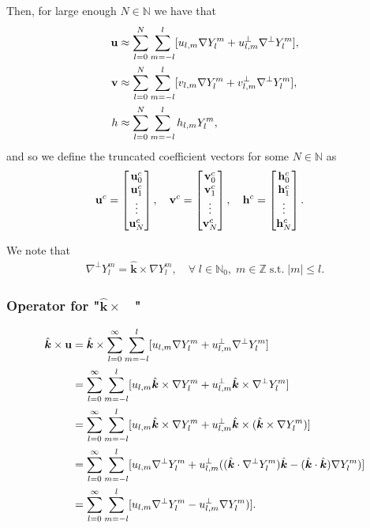 \documentclass[11pt, oneside]{article}   	%
\newcommand{\Z}{\mathbb{Z}}
\newcommand{\N}{\mathbb{N}}
\newcommand{\No}{\mathbb{N}_0}
\newcommand{\Ylm}{Y^m_l}
\newcommand{\gradYlm}{\nabla Y^m_l}
\newcommand{\gradpYlm}{\nabla^\perp Y^m_l}
\newcommand{\unitvec}{\hat{\bm{k}}}
\begin{document}
Then, for large enough \(N \in \N\) we have that
\begin{align}
\bold{u} &\approx \sum_{l=0}^{N} \sum_{m=-l}^{l} [ u_{l,m} \gradYlm + u^{\perp}_{l,m} \gradpYlm ], \\
\bold{v} &\approx \sum_{l=0}^{N} \sum_{m=-l}^{l} [ v_{l,m} \gradYlm + v^{\perp}_{l,m} \gradpYlm ], \\
h &\approx \sum_{l=0}^{N} \sum_{m=-l}^{l} h_{l,m} \Ylm,
\end{align}
and so we define the truncated coefficient vectors for some \(N \in \N\) as
\begin{align}
\bold{u}^c &= \begin{bmatrix}
			\bold{u}_0^c \\
			\bold{u}_1^c \\
			\vdots \\
			\bold{u}_N^c
		    \end{bmatrix},
\quad
\bold{v}^c = \begin{bmatrix}
			\bold{v}_0^c \\
			\bold{v}_1^c \\
			\vdots \\
			\bold{v}_N^c
		    \end{bmatrix},
\quad
\bold{h}^c = \begin{bmatrix}
			\bold{h}_0^c \\
			\bold{h}_1^c \\
			\vdots \\
			\bold{h}_N^c
		    \end{bmatrix}.		  
\end{align}

We note that
\begin{align}
\gradpYlm = \unitvec \times \gradYlm, \quad \forall \; l \in \No, \; m \in \Z \; \text{s.t.} \; |m| \le l.
\end{align}


\subsubsection{Operator for "\(\unitvec \times \quad\)"}
\begin{align}
\unitvec \times \bold{u} &= \unitvec \times \sum_{l=0}^{\infty} \sum_{m=-l}^{l} [ u_{l,m} \gradYlm + u^{\perp}_{l,m} \gradpYlm ] \\
&= \sum_{l=0}^{\infty} \sum_{m=-l}^{l} [ u_{l,m} \unitvec \times \gradYlm + u^{\perp}_{l,m} \unitvec \times \gradpYlm ] \\
&= \sum_{l=0}^{\infty} \sum_{m=-l}^{l} [ u_{l,m} \unitvec \times \gradYlm + u^{\perp}_{l,m} \unitvec \times ( \unitvec \times \gradYlm ) ] \\
&= \sum_{l=0}^{\infty} \sum_{m=-l}^{l} [ u_{l,m} \gradpYlm + u^{\perp}_{l,m} (( \unitvec \cdot \gradpYlm) \unitvec - ( \unitvec \cdot \unitvec ) \gradYlm ) ] \\
&= \sum_{l=0}^{\infty} \sum_{m=-l}^{l} [ u_{l,m} \gradpYlm - u^{\perp}_{l,m} \gradYlm ) ]. \\
\end{align}
\end{document}

